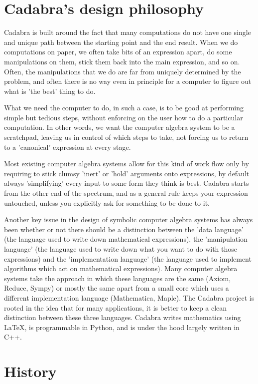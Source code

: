 \documentclass[11pt]{book}
\begin{document}
\section{Cadabra's design philosophy}

Cadabra is built around the fact that many computations do not have
one single and unique path between the starting point and the end
result. When we do computations on paper, we often take bits of an
expression apart, do some manipulations on them, stick them back into
the main expression, and so on. Often, the manipulations that we do
are far from uniquely determined by the problem, and often there is no
way even in principle for a computer to figure out what is 'the best'
thing to do.

What we need the computer to do, in such a case, is to be good at
performing simple but tedious steps, without enforcing on the user how
to do a particular computation. In other words, we want the computer
algebra system to be a scratchpad, leaving us in control of which
steps to take, not forcing us to return to a 'canonical' expression at
every stage.

Most existing computer algebra systems allow for this kind of work
flow only by requiring to stick clumsy 'inert' or 'hold' arguments
onto expressions, by default always 'simplifying' every input to some
form they think is best. Cadabra starts from the other end of the
spectrum, and as a general rule keeps your expression untouched,
unless you explicitly ask for something to be done to it.

Another key issue in the design of symbolic computer algebra systems
has always been whether or not there should be a distinction between
the 'data language' (the language used to write down mathematical
expressions), the 'manipulation language' (the language used to write
down what you want to do with those expressions) and the
'implementation language' (the language used to implement algorithms
which act on mathematical expressions). Many computer algebra systems
take the approach in which these languages are the same (Axiom,
Reduce, Sympy) or mostly the same apart from a small core which uses a
different implementation language (Mathematica, Maple). The Cadabra
project is rooted in the idea that for many applications, it is better
to keep a clean distinction between these three languages. Cadabra
writes mathematics using LaTeX, is programmable in Python, and is
under the hood largely written in C++.

\section{History}
\end{document}
